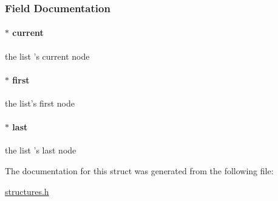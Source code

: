 \subsubsection{Field Documentation}
\hypertarget{structlist_a79bec8ecf9f3599d31d97683cc6f6c54}{
\paragraph[{current}]{$\ast$ current}}\label{structlist_a79bec8ecf9f3599d31d97683cc6f6c54}
the list 's current node \hypertarget{structlist_a02b4428208fd0060bb54d5bb726702d4}{
\paragraph[{first}]{$\ast$ first}}\label{structlist_a02b4428208fd0060bb54d5bb726702d4}
the list's first node \hypertarget{structlist_a1e751cb2643f0c20321d5b233e4fdf65}{
\paragraph[{last}]{$\ast$ last}}\label{structlist_a1e751cb2643f0c20321d5b233e4fdf65}
the list 's last node 

The documentation for this struct was generated from the following file\-:\begin{DoxyCompactItemize}
\item 
\hyperlink{structures_8h}{structures.\-h}\end{DoxyCompactItemize}
